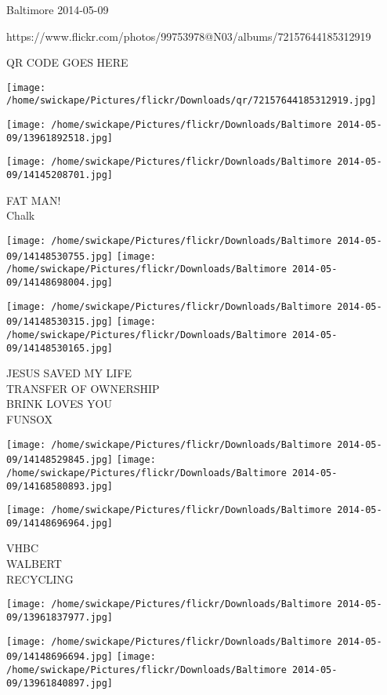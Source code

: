 \documentclass[10pt,letterpaper]{article}
\begin{document}
Baltimore 2014-05-09

https://www.flickr.com/photos/99753978@N03/albums/72157644185312919

QR CODE GOES HERE

\texttt{[image: /home/swickape/Pictures/flickr/Downloads/qr/72157644185312919.jpg]}
\pagebreak

\texttt{[image: /home/swickape/Pictures/flickr/Downloads/Baltimore 2014-05-09/13961892518.jpg]}

\vspace{0.25in}
\texttt{[image: /home/swickape/Pictures/flickr/Downloads/Baltimore 2014-05-09/14145208701.jpg]}

FAT MAN!\\
Chalk\\
\pagebreak

\texttt{[image: /home/swickape/Pictures/flickr/Downloads/Baltimore 2014-05-09/14148530755.jpg]}
\texttt{[image: /home/swickape/Pictures/flickr/Downloads/Baltimore 2014-05-09/14148698004.jpg]}

\texttt{[image: /home/swickape/Pictures/flickr/Downloads/Baltimore 2014-05-09/14148530315.jpg]}
\texttt{[image: /home/swickape/Pictures/flickr/Downloads/Baltimore 2014-05-09/14148530165.jpg]}

JESUS SAVED MY LIFE\\
TRANSFER OF OWNERSHIP\\
BRINK LOVES YOU\\
FUNSOX\\
\pagebreak

\texttt{[image: /home/swickape/Pictures/flickr/Downloads/Baltimore 2014-05-09/14148529845.jpg]}
\texttt{[image: /home/swickape/Pictures/flickr/Downloads/Baltimore 2014-05-09/14168580893.jpg]}

\texttt{[image: /home/swickape/Pictures/flickr/Downloads/Baltimore 2014-05-09/14148696964.jpg]}

VHBC\\
WALBERT\\
RECYCLING\\
\pagebreak

\texttt{[image: /home/swickape/Pictures/flickr/Downloads/Baltimore 2014-05-09/13961837977.jpg]}

\vspace{0.25in}
\texttt{[image: /home/swickape/Pictures/flickr/Downloads/Baltimore 2014-05-09/14148696694.jpg]}
\texttt{[image: /home/swickape/Pictures/flickr/Downloads/Baltimore 2014-05-09/13961840897.jpg]}
\end{document}
